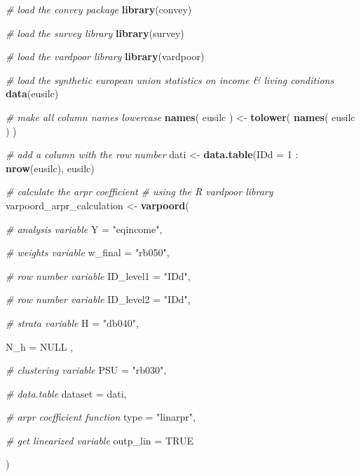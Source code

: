 \documentclass[]{book}
\newenvironment{Shaded}{\begin{snugshade}}{\end{snugshade}}
\newcommand{\KeywordTok}[1]{\textcolor[rgb]{0.13,0.29,0.53}{\textbf{{#1}}}}
\newcommand{\DataTypeTok}[1]{\textcolor[rgb]{0.13,0.29,0.53}{{#1}}}
\newcommand{\DecValTok}[1]{\textcolor[rgb]{0.00,0.00,0.81}{{#1}}}
\newcommand{\StringTok}[1]{\textcolor[rgb]{0.31,0.60,0.02}{{#1}}}
\newcommand{\CommentTok}[1]{\textcolor[rgb]{0.56,0.35,0.01}{\textit{{#1}}}}
\newcommand{\OtherTok}[1]{\textcolor[rgb]{0.56,0.35,0.01}{{#1}}}
\newcommand{\NormalTok}[1]{{#1}}
\theoremstyle{definition}
\theoremstyle{definition}
\theoremstyle{remark}
\begin{document}
\begin{Shaded}
\begin{Highlighting}[]
\CommentTok{# load the convey package}
\KeywordTok{library}\NormalTok{(convey)}

\CommentTok{# load the survey library}
\KeywordTok{library}\NormalTok{(survey)}

\CommentTok{# load the vardpoor library}
\KeywordTok{library}\NormalTok{(vardpoor)}

\CommentTok{# load the synthetic european union statistics on income & living conditions}
\KeywordTok{data}\NormalTok{(eusilc)}

\CommentTok{# make all column names lowercase}
\KeywordTok{names}\NormalTok{( eusilc ) <-}\StringTok{ }\KeywordTok{tolower}\NormalTok{( }\KeywordTok{names}\NormalTok{( eusilc ) )}

\CommentTok{# add a column with the row number}
\NormalTok{dati <-}\StringTok{ }\KeywordTok{data.table}\NormalTok{(}\DataTypeTok{IDd =} \DecValTok{1} \NormalTok{:}\StringTok{ }\KeywordTok{nrow}\NormalTok{(eusilc), eusilc)}

\CommentTok{# calculate the arpr coefficient}
\CommentTok{# using the R vardpoor library}
\NormalTok{varpoord_arpr_calculation <-}
\StringTok{    }\KeywordTok{varpoord}\NormalTok{(}
    
        \CommentTok{# analysis variable}
        \DataTypeTok{Y =} \StringTok{"eqincome"}\NormalTok{, }
        
        \CommentTok{# weights variable}
        \DataTypeTok{w_final =} \StringTok{"rb050"}\NormalTok{,}
        
        \CommentTok{# row number variable}
        \DataTypeTok{ID_level1 =} \StringTok{"IDd"}\NormalTok{,}
        
        \CommentTok{# row number variable}
        \DataTypeTok{ID_level2 =} \StringTok{"IDd"}\NormalTok{,}
        
        \CommentTok{# strata variable}
        \DataTypeTok{H =} \StringTok{"db040"}\NormalTok{, }
        
        \DataTypeTok{N_h =} \OtherTok{NULL} \NormalTok{,}
        
        \CommentTok{# clustering variable}
        \DataTypeTok{PSU =} \StringTok{"rb030"}\NormalTok{, }
        
        \CommentTok{# data.table}
        \DataTypeTok{dataset =} \NormalTok{dati, }
        
        \CommentTok{# arpr coefficient function}
        \DataTypeTok{type =} \StringTok{"linarpr"}\NormalTok{,}
      
      \CommentTok{# get linearized variable}
      \DataTypeTok{outp_lin =} \OtherTok{TRUE}
        
    \NormalTok{)}
\end{Highlighting}
\end{Shaded}
\end{document}
